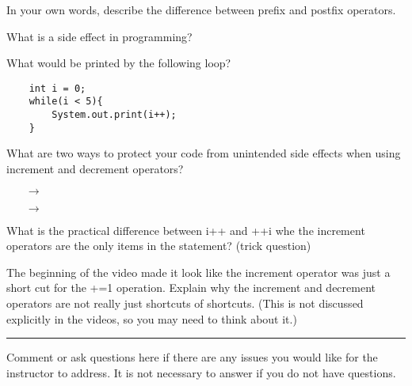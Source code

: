 \documentclass[letterpaper,12pt]{exam}
\begin{document}
\begin{questions}
\begin{samepage}
    \question In your own words, describe the difference between prefix and postfix operators.
    \vspace{25mm}
\end{samepage}

\begin{samepage}
    \question What is a side effect in programming?
    \vspace{5mm}
\end{samepage}

\begin{samepage}
    \question What would be printed by the following loop?
    \begin{verbatim}
    int i = 0;
    while(i < 5){
        System.out.print(i++);
    }
    \end{verbatim}
    \vspace{5mm}
\end{samepage}

\begin{samepage}
    \question What are two ways to protect your code from unintended side effects when using increment and decrement operators?
      \begin{itemize}
        \item [$\rightarrow$]
        \vspace{5mm}
        \item [$\rightarrow$]
        \vspace{5mm}
           \end{itemize}
\end{samepage}

\begin{samepage}
    \question What is the practical difference between i++ and ++i whe the increment operators are the only items in the statement?  (trick question)
    \vspace{5mm}
\end{samepage}

\begin{samepage}
    \question The beginning of the video made it look like the increment operator was just a short cut for the +=1 operation.  Explain why the increment and decrement operators are not really just shortcuts of shortcuts.  (This is not discussed explicitly in the videos, so you may need to think about it.)
    \vspace{5mm}
\end{samepage}


\begin{samepage}
    \begin{center}
    \rule{0.8\textwidth}{.4pt}
    \end{center}
	\question Comment or ask questions here if there are any issues you would like for the instructor to address.  It is not necessary to answer if you do not have questions.
	\vspace{30mm}
\end{samepage}

\end{questions}
\end{document}
